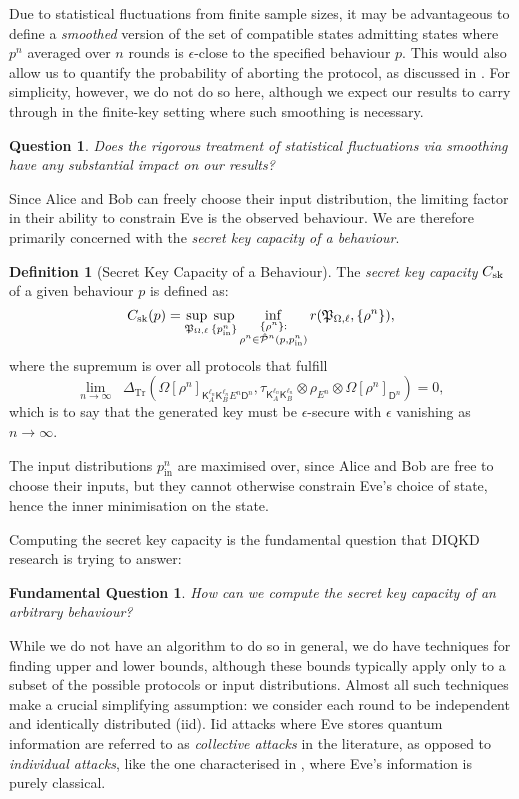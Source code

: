 \documentclass[10pt, a4paper]{article}
\numberwithin{equation}{section} %
\newcounter{stmt} %
\theoremstyle{definition}
\newtheorem{defn}[stmt]{Definition}
\theoremstyle{plain}
\newtheorem{question}{Question}
\newtheorem{funqn}{Fundamental Question}
\newcommand{\?}{\mathrel{?}} %
\newcommand{\Trdist}[2]{\mathop{}\Delta_\mathrm{Tr}\left(#1, #2\right)}
\newcommand{\crv}[1]{\mathsf{#1}}
\newcommand{\compatstates}[3][]{\hat{\mathcal{P}}#1(#2,#3)}
\newcommand{\proto}[2][_{\Omega,\ell}]{\mathfrak{#2}#1}
\newcommand{\prin}[1][p]{#1_{\mathrm{in}}}
\newcommand{\sk}{\rm sk}
\begin{document}
    Due to statistical fluctuations from finite sample sizes, it may be advantageous to define a \emph{smoothed} version of the set of compatible states admitting states where \(p^n\) averaged over \(n\) rounds is \(\epsilon\)-close to the specified behaviour \(p\). This would also allow us to quantify the probability of aborting the protocol, as discussed in . For simplicity, however, we do not do so here, although we expect our results to carry through in the finite-key setting where such smoothing is necessary.
    \begin{question}
      Does the rigorous treatment of statistical fluctuations via smoothing have any substantial impact on our results?
    \end{question}

    Since Alice and Bob can freely choose their input distribution, the limiting factor in their ability to constrain Eve is the observed behaviour. We are therefore primarily concerned with the \emph{secret key capacity of a behaviour}.
    \begin{defn}[Secret Key Capacity of a Behaviour]\label{def:seckeycapbehav}
    The \emph{secret key capacity} \(C_{\sk}\) of a given behaviour \(p\) is defined as:
    \begin{equation}
    C_{\sk}(p) = \sup_{\proto{P}} \sup_{\{\prin^n\}} \inf_{\substack{\{\rho^{n}\} : \\ \rho^{n} \in \compatstates[^n]{p}{\prin^n}}} r(\proto{P}, \{\rho^{n}\}),
    \end{equation}
    where the supremum is over all protocols that fulfill
    \begin{equation}
    \lim_{n\to\infty} \Trdist{{\Omega[\rho^n]}_{\crv{K}_{A}^{\ell_n} \crv{K}_{B}^{\ell_n} E^n \crv{D}^n}}{\tau_{\crv{K}_{A}^{\ell_n} \crv{K}_{B}^{\ell_n}} \otimes \rho_{E^n} \otimes {\Omega[\rho^n]}_{\crv{D}^n}} = 0,
    \end{equation}
    which is to say that the generated key must be \(\epsilon\)-secure with \(\epsilon\) vanishing as \(n\to\infty\).
    \end{defn}
    The input distributions \(\prin^n\) are maximised over, since Alice and Bob are free to choose their inputs, but they cannot otherwise constrain Eve's choice of state, hence the inner minimisation on the state.

    Computing the secret key capacity is the fundamental question that DIQKD research is trying to answer:
    \begin{funqn}\label{fqn:cap}
      How can we compute the secret key capacity of an arbitrary behaviour?
    \end{funqn}
    While we do not have an algorithm to do so in general, we do have techniques for finding upper and lower bounds, although these bounds typically apply only to a subset of the possible protocols or input distributions. Almost all such techniques make a crucial simplifying assumption: we consider each round to be independent and identically distributed (iid). Iid attacks where Eve stores quantum information are referred to as \emph{collective attacks} in the literature, as opposed to \emph{individual attacks}, like the one characterised in , where Eve's information is purely classical.
\end{document}
